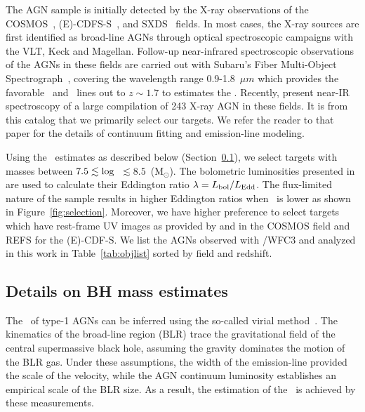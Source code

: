 \documentclass[apj]{emulateapj}
\begin{document}
The AGN sample is initially detected by the X-ray observations of the COSMOS~\citep{Civano2016}, (E)-CDFS-S~\citep{Lehmer2005, Xue2011}, and SXDS~\citep{Ueda2008} fields. In most cases, the X-ray sources are first identified as broad-line AGNs through optical spectroscopic campaigns with the VLT, Keck and Magellan. Follow-up near-infrared spectroscopic observations of the AGNs in these fields are carried out with Subaru's Fiber Multi-Object Spectrograph~\citep[FMOS, ][]{Kimura2010, Nobuta2012,Matsuoka2013}, covering the wavelength range 0.9-1.8~$\mu m$ which provides the favorable \halpha\ and \hbeta\ lines out to $z\sim1.7$ to estimates the \mbh. Recently, \citet{Schulze2018} present near-IR spectroscopy of a large compilation of 243 X-ray AGN in these fields. It is from this catalog that we primarily select our targets. We refer the reader to that paper for the details of continuum fitting and emission-line modeling. 

Using the \mbh\ estimates as described below (Section~\ref{mbh}), we select targets with masses between $7.5 \lesssim {\rm log}$~\mbh$\lesssim8.5$~(M$_{\odot}$). The bolometric luminosities presented in \citet{Schulze2018} are used to calculate their Eddington ratio $\lambda = L_{\rm bol}/L_{\rm Edd}$. The flux-limited nature of the sample results in higher Eddington ratios when \mbh\ is lower as shown in Figure~\ref{fig:selection}. Moreover, we have higher preference to select targets which have rest-frame UV images as provided by \citet{Scoville2007} and \citet{Koekemoer2007} in the COSMOS field and REFS for the (E)-CDF-S. We list the AGNs observed with \hst/WFC3 and analyzed in this work in Table~\ref{tab:objlist} sorted by field and redshift.




\subsection{Details on BH mass estimates}
\label{mbh}

The \mbh\ of type-1 AGNs can be inferred using the so-called virial method~\citep{Peterson2004, Shen2013}. The kinematics of the broad-line region (BLR) trace the gravitational field of the central supermassive black hole, assuming the gravity dominates the motion of the BLR gas. Under these assumptions, the width of the emission-line provided the scale of the velocity, while the AGN continuum luminosity establishes an empirical scale of the BLR size. As a result, the estimation of the \mbh\ is achieved by these measurements.
\end{document}
